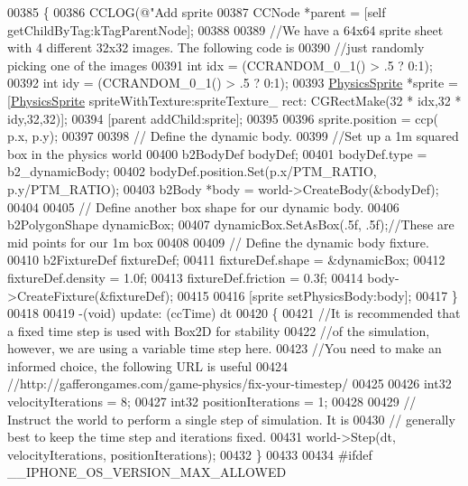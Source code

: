 \begin{DoxyCode}
{{{{{{{00385 \{
00386     CCLOG(\textcolor{stringliteral}{@"Add sprite %
00387     CCNode *parent = [\textcolor{keyword}{self} getChildByTag:kTagParentNode];
00388     
00389     \textcolor{comment}{//We have a 64x64 sprite sheet with 4 different 32x32 images.  The following code is}
00390     \textcolor{comment}{//just randomly picking one of the images}
00391     \textcolor{keywordtype}{int} idx = (CCRANDOM\_0\_1() > .5 ? 0:1);
00392     \textcolor{keywordtype}{int} idy = (CCRANDOM\_0\_1() > .5 ? 0:1);
00393     \hyperlink{interface_physics_sprite}{PhysicsSprite} *sprite = [\hyperlink{interface_physics_sprite}{PhysicsSprite} spriteWithTexture:spriteTexture\_ rect:
      CGRectMake(32 * idx,32 * idy,32,32)];
00394     [parent addChild:sprite];
00395     
00396     sprite.position = ccp( p.x, p.y);
00397     
00398     \textcolor{comment}{// Define the dynamic body.}
00399     \textcolor{comment}{//Set up a 1m squared box in the physics world}
00400     b2BodyDef bodyDef;
00401     bodyDef.type = b2\_dynamicBody;
00402     bodyDef.position.Set(p.x/PTM\_RATIO, p.y/PTM\_RATIO);
00403     b2Body *body = world->CreateBody(&bodyDef);
00404     
00405     \textcolor{comment}{// Define another box shape for our dynamic body.}
00406     b2PolygonShape dynamicBox;
00407     dynamicBox.SetAsBox(.5f, .5f);\textcolor{comment}{//These are mid points for our 1m box}
00408     
00409     \textcolor{comment}{// Define the dynamic body fixture.}
00410     b2FixtureDef fixtureDef;
00411     fixtureDef.shape = &dynamicBox;
00412     fixtureDef.density = 1.0f;
00413     fixtureDef.friction = 0.3f;
00414     body->CreateFixture(&fixtureDef);
00415     
00416     [sprite setPhysicsBody:body];
00417 \}
00418 
00419 -(void) update: (ccTime) dt
00420 \{
00421     \textcolor{comment}{//It is recommended that a fixed time step is used with Box2D for stability}
00422     \textcolor{comment}{//of the simulation, however, we are using a variable time step here.}
00423     \textcolor{comment}{//You need to make an informed choice, the following URL is useful}
00424     \textcolor{comment}{//http://gafferongames.com/game-physics/fix-your-timestep/}
00425     
00426     int32 velocityIterations = 8;
00427     int32 positionIterations = 1;
00428     
00429     \textcolor{comment}{// Instruct the world to perform a single step of simulation. It is}
00430     \textcolor{comment}{// generally best to keep the time step and iterations fixed.}
00431     world->Step(dt, velocityIterations, positionIterations);    
00432 \}
00433 
00434 \textcolor{preprocessor}{#ifdef \_\_IPHONE\_OS\_VERSION\_MAX\_ALLOWED}
}}}}}}}}
\end{DoxyCode}

